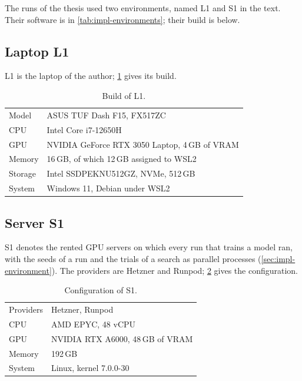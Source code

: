 The runs of the thesis used two environments, named L1 and S1 in the text. Their software is in
\cref{tab:impl-environments}; their build is below.

\subsection{Laptop L1}
\label{app:machine-l1}

L1 is the laptop of the author; \cref{tab:app-machine-l1} gives its build.

\begin{table}[htbp]
\centering
\footnotesize
\caption{Build of L1.}
\label{tab:app-machine-l1}
\begin{tabular}{@{}ll@{}}
\toprule
Model & ASUS TUF Dash F15, FX517ZC \\
CPU & Intel Core i7-12650H \\
GPU & NVIDIA GeForce RTX 3050 Laptop, 4\,GB of VRAM \\
Memory & 16\,GB, of which 12\,GB assigned to WSL2 \\
Storage & Intel SSDPEKNU512GZ, NVMe, 512\,GB \\
System & Windows 11, Debian under WSL2 \\
\bottomrule
\end{tabular}
\end{table}

\subsection{Server S1}
\label{app:machine-s1}

S1 denotes the rented GPU servers on which every run that trains a model ran, with the seeds of a run
and the trials of a search as parallel processes (\cref{sec:impl-environment}). The providers are
Hetzner and Runpod; \cref{tab:app-machine-s1} gives the configuration.

\begin{table}[htbp]
\centering
\footnotesize
\caption{Configuration of S1.}
\label{tab:app-machine-s1}
\begin{tabular}{@{}ll@{}}
\toprule
Providers & Hetzner, Runpod \\
CPU & AMD EPYC, 48 vCPU \\
GPU & NVIDIA RTX A6000, 48\,GB of VRAM \\
Memory & 192\,GB \\
System & Linux, kernel 7.0.0-30 \\
\bottomrule
\end{tabular}
\end{table}

